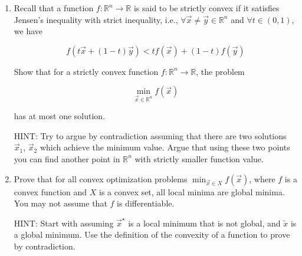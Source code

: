 \documentclass[
  12pt,
]{fphw}
\begin{document}
\begin{enumerate}

\item[(a)] Recall that a function $f : \mathbb{R}^n \rightarrow \mathbb{R}$ is said to be strictly convex if it satisfies Jensen’s inequality with strict inequality, i.e., $\forall \vec{x} \ne \vec{y} \in \mathbb{R}^n$ and $\forall t \in (0,1)$, we have

\[
f(t\vec{x} + (1-t)\vec{y}) < t f(\vec{x}) + (1-t) f(\vec{y})
\]

Show that for a strictly convex function $f : \mathbb{R}^n \rightarrow \mathbb{R}$, the problem

\[
\min_{\vec{x} \in \mathbb{R}^n} f(\vec{x})
\]

has at most one solution.

HINT: Try to argue by contradiction assuming that there are two solutions $\vec{x}_1$, $\vec{x}_2$ which achieve the minimum value. Argue that using these two points you can find another point in $\mathbb{R}^n$ with strictly smaller function value.

\item[(b)] Prove that for all convex optimization problems $\min_{\vec{x} \in X} f(\vec{x})$, where $f$ is a convex function and $X$ is a convex set, all local minima are global minima. You may not assume that $f$ is differentiable.

HINT: Start with assuming $\vec{x}^\star$ is a local minimum that is not global, and $\tilde{x}$ is a global minimum. Use the definition of the convexity of a function to prove by contradiction.

\end{enumerate}
\end{document}
